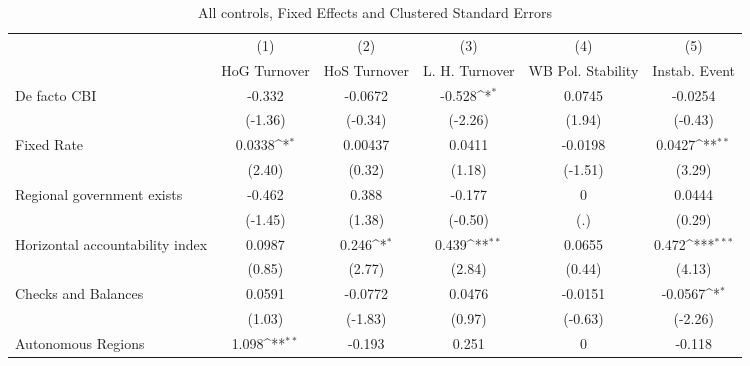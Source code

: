 \begin{table}[htbp]\centering
\def\sym#1{\ifmmode^{#1}\else\(^{#1}\)\fi}
\caption{All controls, Fixed Effects and Clustered Standard Errors \label{fullcmultIndFEDF}}
\begin{tabular}{l*{5}{c}}
\toprule
                                        &\multicolumn{1}{c}{(1)}&\multicolumn{1}{c}{(2)}&\multicolumn{1}{c}{(3)}&\multicolumn{1}{c}{(4)}&\multicolumn{1}{c}{(5)}\\
                                        &\multicolumn{1}{c}{HoG Turnover}&\multicolumn{1}{c}{HoS Turnover}&\multicolumn{1}{c}{L. H. Turnover}&\multicolumn{1}{c}{WB Pol. Stability}&\multicolumn{1}{c}{Instab. Event}\\
\midrule
De facto CBI                            &   -0.332         &  -0.0672         &   -0.528\sym{*}  &   0.0745         &  -0.0254         \\
                                        &  (-1.36)         &  (-0.34)         &  (-2.26)         &   (1.94)         &  (-0.43)         \\
\addlinespace
Fixed Rate                              &   0.0338\sym{*}  &  0.00437         &   0.0411         &  -0.0198         &   0.0427\sym{**} \\
                                        &   (2.40)         &   (0.32)         &   (1.18)         &  (-1.51)         &   (3.29)         \\
\addlinespace
Regional government exists              &   -0.462         &    0.388         &   -0.177         &        0         &   0.0444         \\
                                        &  (-1.45)         &   (1.38)         &  (-0.50)         &      (.)         &   (0.29)         \\
\addlinespace
Horizontal accountability index         &   0.0987         &    0.246\sym{*}  &    0.439\sym{**} &   0.0655         &    0.472\sym{***}\\
                                        &   (0.85)         &   (2.77)         &   (2.84)         &   (0.44)         &   (4.13)         \\
\addlinespace
Checks and Balances                     &   0.0591         &  -0.0772         &   0.0476         &  -0.0151         &  -0.0567\sym{*}  \\
                                        &   (1.03)         &  (-1.83)         &   (0.97)         &  (-0.63)         &  (-2.26)         \\
\addlinespace
Autonomous Regions                      &    1.098\sym{**} &   -0.193         &    0.251         &        0         &   -0.118         \\

\end{tabular}
\end{table}
